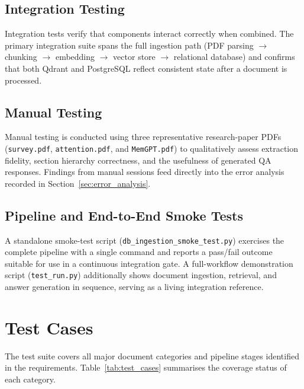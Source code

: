 \documentclass[12pt,a4paper]{report}
\begin{document}
\subsection{Integration Testing}

Integration tests verify that components interact correctly when combined. The
primary integration suite spans the full ingestion path (PDF parsing
$\rightarrow$ chunking $\rightarrow$ embedding $\rightarrow$ vector store
$\rightarrow$ relational database) and confirms that both Qdrant and PostgreSQL
reflect consistent state after a document is processed.

\subsection{Manual Testing}

Manual testing is conducted using three representative research-paper PDFs
(\texttt{survey.pdf}, \texttt{attention.pdf}, and \texttt{MemGPT.pdf}) to
qualitatively assess extraction fidelity, section hierarchy correctness, and the
usefulness of generated QA responses. Findings from manual sessions feed
directly into the error analysis recorded in Section~\ref{sec:error_analysis}.

\subsection{Pipeline and End-to-End Smoke Tests}

A standalone smoke-test script (\texttt{db\_ingestion\_smoke\_test.py}) exercises
the complete pipeline with a single command and reports a pass/fail outcome
suitable for use in a continuous integration gate. A full-workflow demonstration
script (\texttt{test\_run.py}) additionally shows document ingestion, retrieval,
and answer generation in sequence, serving as a living integration reference.

\section{Test Cases}

The test suite covers all major document categories and pipeline stages
identified in the requirements. Table~\ref{tab:test_cases} summarises the
coverage status of each category.
\end{document}
